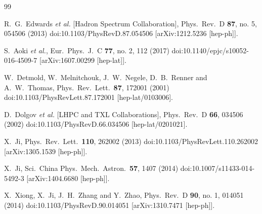 \documentclass[prd,aps,twocolumn,preprintnumbers, showpacs, nofootinbib,superscriptaddress,notitlepage]{revtex4-1}
\begin{document}
\begin{thebibliography}{99}

  R.~G.~Edwards {\it et al.} [Hadron Spectrum Collaboration],
  Phys.\ Rev.\ D {\bf 87}, no. 5, 054506 (2013)
  doi:10.1103/PhysRevD.87.054506
  [arXiv:1212.5236 [hep-ph]].

  S.~Aoki {\it et al.},
  Eur.\ Phys.\ J.\ C {\bf 77}, no. 2, 112 (2017)
  doi:10.1140/epjc/s10052-016-4509-7
  [arXiv:1607.00299 [hep-lat]].


	W.~Detmold, W.~Melnitchouk, J.~W.~Negele, D.~B.~Renner and A.~W.~Thomas,
	Phys.\ Rev.\ Lett.\  {\bf 87}, 172001 (2001)
	doi:10.1103/PhysRevLett.87.172001
	[hep-lat/0103006].
	
	
	D.~Dolgov {\it et al.} [LHPC and TXL Collaborations],
	Phys.\ Rev.\ D {\bf 66}, 034506 (2002)
	doi:10.1103/PhysRevD.66.034506
	[hep-lat/0201021].
	

	X.~Ji,
	Phys.\ Rev.\ Lett.\  {\bf 110}, 262002 (2013)
	doi:10.1103/PhysRevLett.110.262002
	[arXiv:1305.1539 [hep-ph]].
	
	
	X.~Ji,
	Sci.\ China Phys.\ Mech.\ Astron.\  {\bf 57}, 1407 (2014)
	doi:10.1007/s11433-014-5492-3
	[arXiv:1404.6680 [hep-ph]].
	
	
	X.~Xiong, X.~Ji, J.~H.~Zhang and Y.~Zhao,
	Phys.\ Rev.\ D {\bf 90}, no. 1, 014051 (2014)
	doi:10.1103/PhysRevD.90.014051
	[arXiv:1310.7471 [hep-ph]].
	

\end{thebibliography}
\end{document}
